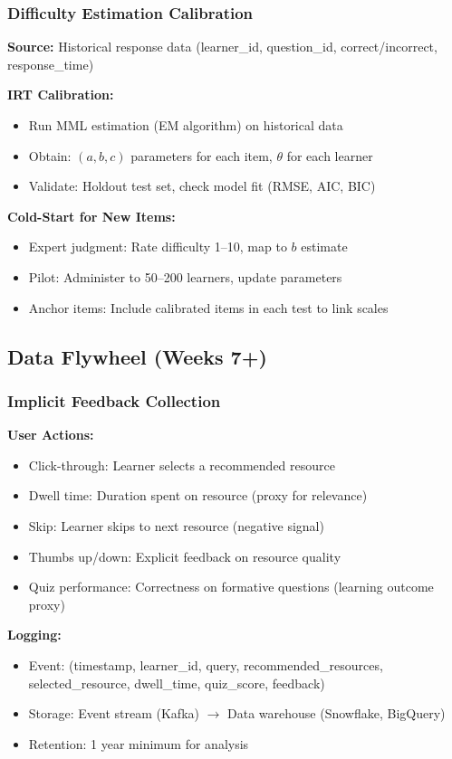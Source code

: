 \documentclass[11pt,letterpaper]{article}
\begin{document}
\subsubsection{Difficulty Estimation Calibration}

\textbf{Source:} Historical response data (learner\_id, question\_id, correct/incorrect, response\_time)

\textbf{IRT Calibration:}
\begin{itemize}
\item Run MML estimation (EM algorithm) on historical data
\item Obtain: $(a, b, c)$ parameters for each item, $\theta$ for each learner
\item Validate: Holdout test set, check model fit (RMSE, AIC, BIC)
\end{itemize}

\textbf{Cold-Start for New Items:}
\begin{itemize}
\item Expert judgment: Rate difficulty 1--10, map to $b$ estimate
\item Pilot: Administer to 50--200 learners, update parameters
\item Anchor items: Include calibrated items in each test to link scales
\end{itemize}

\subsection{Data Flywheel (Weeks 7+)}

\subsubsection{Implicit Feedback Collection}

\textbf{User Actions:}
\begin{itemize}
\item Click-through: Learner selects a recommended resource
\item Dwell time: Duration spent on resource (proxy for relevance)
\item Skip: Learner skips to next resource (negative signal)
\item Thumbs up/down: Explicit feedback on resource quality
\item Quiz performance: Correctness on formative questions (learning outcome proxy)
\end{itemize}

\textbf{Logging:}
\begin{itemize}
\item Event: (timestamp, learner\_id, query, recommended\_resources, selected\_resource, dwell\_time, quiz\_score, feedback)
\item Storage: Event stream (Kafka) $\rightarrow$ Data warehouse (Snowflake, BigQuery)
\item Retention: 1 year minimum for analysis
\end{itemize}
\end{document}
